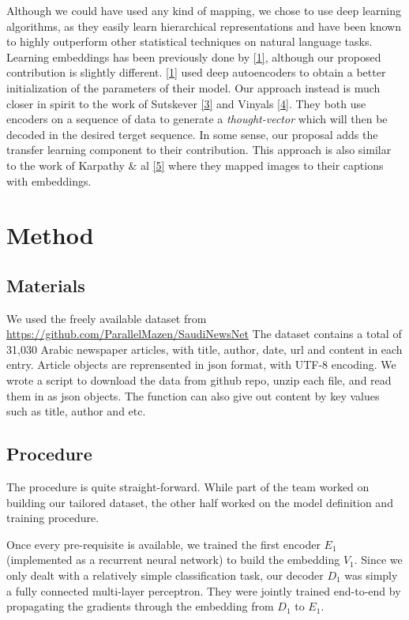 \documentclass[12pt]{article}
\begin{document}
Although we could have used any kind of mapping, we chose to use deep
learning algorithms, as they easily learn hierarchical representations
and have been known to highly outperform other statistical techniques on
natural language tasks. Learning embeddings has been previously done by
\href{References}{{[}1{]}}, although our proposed contribution is
slightly different. \href{References}{{[}1{]}} used deep autoencoders to
obtain a better initialization of the parameters of their model. Our
approach instead is much closer in spirit to the work of Sutskever
\href{References}{{[}3{]}} and Vinyals \href{References}{{[}4{]}}. They
both use encoders on a sequence of data to generate a
\emph{thought-vector} which will then be decoded in the desired terget
sequence. In some sense, our proposal adds the transfer learning
component to their contribution. This approach is also similar to the
work of Karpathy \& al \href{References}{{[}5{]}} where they mapped
images to their captions with embeddings.

\section{Method}\label{method}

\subsection{Materials}\label{materials}

We used the freely available dataset from
\url{https://github.com/ParallelMazen/SaudiNewsNet} The dataset contains
a total of 31,030 Arabic newspaper articles, with title, author, date,
url and content in each entry. Article objects are reprensented in json
format, with UTF-8 encoding. We wrote a script to download the data from
github repo, unzip each file, and read them in as json objects. The
function can also give out content by key values such as title, author
and etc.

\subsection{Procedure}\label{procedure}

The procedure is quite straight-forward. While part of the team worked
on building our tailored dataset, the other half worked on the model
definition and training procedure.

Once every pre-requisite is available, we trained the first encoder
$E_1$ (implemented as a recurrent neural network) to build the embedding
$V_1$. Since we only dealt with a relatively simple classification task,
our decoder $D_1$ was simply a fully connected multi-layer perceptron.
They were jointly trained end-to-end by propagating the gradients
through the embedding from $D_1$ to $E_1$.
\end{document}
